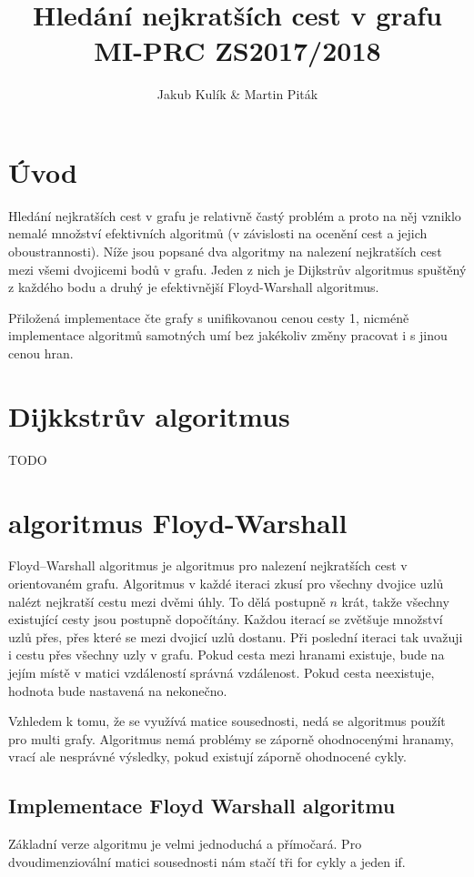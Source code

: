 \documentclass[11pt, fleqn]{article}
\title{Hledání nejkratších cest v grafu \\ MI-PRC ZS2017/2018}
\author{Jakub Kulík \& Martin Piták}
\begin{document}
\maketitle

\section{Úvod}

Hledání nejkratších cest v grafu je relativně častý problém a proto na něj vzniklo nemalé množství efektivních algoritmů (v závislosti na ocenění cest a jejich oboustrannosti). Níže jsou popsané dva algoritmy na nalezení nejkratších cest mezi všemi dvojicemi bodů v grafu. Jeden z nich je Dijkstrův algoritmus spuštěný z každého bodu a druhý je efektivnější Floyd-Warshall algoritmus.

Přiložená implementace čte grafy s unifikovanou cenou cesty 1, nicméně implementace algoritmů samotných umí bez jakékoliv změny pracovat i s jinou cenou hran.

\section{Dijkkstrův algoritmus}

TODO



\section{algoritmus Floyd-Warshall}

Floyd–Warshall algoritmus je algoritmus pro nalezení nejkratších cest v orientovaném grafu. Algoritmus v každé iteraci zkusí pro všechny dvojice uzlů nalézt nejkratší cestu mezi dvěmi úhly. To dělá postupně $n$ krát, takže všechny existující cesty jsou postupně dopočítány. Každou iterací se zvětšuje množství uzlů přes, přes které se mezi dvojicí uzlů dostanu. Při poslední iteraci tak uvažuji i cestu přes všechny uzly v grafu. Pokud cesta mezi hranami existuje, bude na jejím místě v matici vzdáleností správná vzdálenost. Pokud cesta neexistuje, hodnota bude nastavená na nekonečno.

Vzhledem k tomu, že se využívá matice sousednosti, nedá se algoritmus použít pro multi grafy. Algoritmus nemá problémy se záporně ohodnocenými hranamy, vrací ale nesprávné výsledky, pokud existují záporně ohodnocené cykly.


\subsection{Implementace Floyd Warshall algoritmu}
Základní verze algoritmu je velmi jednoduchá a přímočará. Pro dvoudimenziovální matici sousednosti nám stačí tři for cykly a jeden if.
\end{document}
